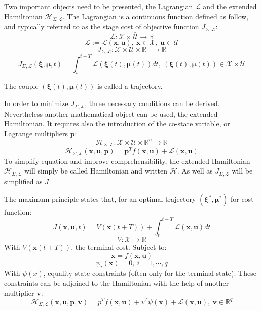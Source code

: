 \documentclass[a4paper, 12pt]{report}
\begin{document}
Two important objects need to be presented, the Lagrangian $\mathcal{L}$ and the extended Hamiltonian $\mathcal{H}_{\Sigma,\mathcal{L}}$. The Lagrangian is a continuous function defined as follow, and typically referred to as the stage cost of objective function $J_{\Sigma,\mathcal{L}}$:
\[ \mathcal{L}: \mathcal{X} \times \bar{\mathcal{U}} \rightarrow \mathbb{R} \]
\[ \mathcal{L} := \mathcal{L}(\boldsymbol{x}, \boldsymbol{u}),\ \boldsymbol{x} \in \mathcal{X},\ \boldsymbol{u} \in \mathcal{U} \]
\[ J_{\Sigma,\mathcal{L}}: \mathcal{X} \times \mathcal{U} \times \mathbb{R_+} \rightarrow \mathbb{R} \]
\[ J_{\Sigma,\mathcal{L}}(\boldsymbol{\xi}, \boldsymbol{\mu}, t) = \int_{t}^{t+T} \mathcal{L}(\boldsymbol{\xi}(t), \boldsymbol{\mu}(t))dt, \ (\boldsymbol{\xi}(t), \boldsymbol{\mu}(t)) \in  \mathcal{X} \times \bar{\mathcal{U}}\]

The couple $(\boldsymbol{\xi}(t), \boldsymbol{\mu}(t))$ is called a trajectory.

In order to minimize  $J_{\Sigma,\mathcal{L}}$, three necessary conditions can be derived. Nevertheless another mathematical object can be used, the extended Hamiltonian. It requires also the introduction of the co-state variable, or Lagrange multipliers $\boldsymbol{p}$:
\[ \mathcal{H}_{\Sigma,\mathcal{L}}: \mathcal{X} \times \mathcal{U} \times \mathbb{R}^n \rightarrow \mathbb{R} \]
\[ \mathcal{H}_{\Sigma,\mathcal{L}}(\boldsymbol{x}, \boldsymbol{u}, \boldsymbol{p}) = \boldsymbol{p}^Tf(\boldsymbol{x}, \boldsymbol{u}) + \mathcal{L}(\boldsymbol{x}, \boldsymbol{u}) \]
To simplify equation and improve comprehensibility, the extended Hamiltonian $\mathcal{H}_{\Sigma,\mathcal{L}}$ will simply be called Hamiltonian and written $\mathcal{H}$. As well as $J_{\Sigma,\mathcal{L}}$ will be simplified as $J$

The maximum principle states that, for an optimal trajectory $(\boldsymbol{\xi}^*, \boldsymbol{\mu}^*)$ for cost function:
\[ J(\boldsymbol{x}, \boldsymbol{u}, t) = V(\boldsymbol{x}(t+T))  + \int_t^{t+T} \mathcal{L}(\boldsymbol{x}, \boldsymbol{u})dt\]
\[ V: \mathcal{X} \rightarrow \mathbb{R} \]
With $ V(\boldsymbol{x}(t+T))$, the terminal cost. Subject to:
\[ \boldsymbol{\dot x} = f(\boldsymbol{x}, \boldsymbol{u}) \]
\[ \psi_i(\boldsymbol{x}) = 0,\ i = 1, \cdots, q \]
With $\psi(x)$, equality state constraints (often only for the terminal state). These constraints can be adjoined to the Hamiltonian with the help of another multiplier $\boldsymbol{v}$:
\[ \mathcal{H}_{\Sigma,\mathcal{L}}(\boldsymbol{x}, \boldsymbol{u}, \boldsymbol{p}, \boldsymbol{v}) = p^T f(\boldsymbol{x}, \boldsymbol{u}) + v^T\psi(\boldsymbol{x}) + \mathcal{L}(\boldsymbol{x}, \boldsymbol{u}),\ \boldsymbol{v} \in \mathbb{R}^q \]
\end{document}
